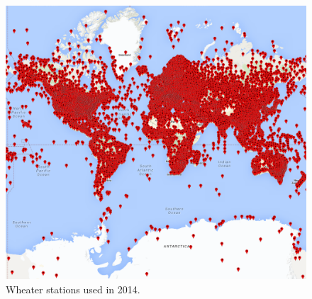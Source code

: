 \documentclass{vldb}
\begin{document}
\begin{figure}[tbh]
\includegraphics[width=1\linewidth]{stations2014}
\caption{Wheater stations used in 2014.}
\label{fig:stations2014}
\end{figure}




\clearpage

\balance





\end{document}
